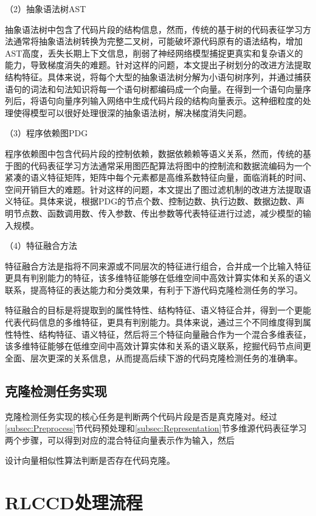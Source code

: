 （2）抽象语法树AST

抽象语法树中包含了代码片段的结构信息，然而，传统的基于树的代码表征学习方法通常将抽象语法树转换为完整二叉树，可能破坏源代码原有的语法结构，增加AST高度，丢失长期上下文信息，削弱了神经网络模型捕捉更真实和复杂语义的能力，导致梯度消失的难题。针对这样的问题，本文提出子树划分的改进方法提取结构特征。具体来说，将每个大型的抽象语法树分解为小语句树序列，并通过捕获语句的词法和句法知识将每一个语句树都编码成一个向量。在得到一个语句向量序列后，将语句向量序列输入网络中生成代码片段的结构向量表示。这种细粒度的处理使得模型可以很好处理很深的抽象语法树，解决梯度消失问题。

（3）程序依赖图PDG

程序依赖图中包含代码片段的控制依赖，数据依赖赖等语义关系，然而，传统的基于图的代码表征学习方法通常采用图匹配算法将图中的控制流和数据流编码为一个紧凑的语义特征矩阵，矩阵中每个元素都是高维系数特征向量，面临消耗的时间、空间开销巨大的难题。针对这样的问题，本文提出了图过滤机制的改进方法提取语义特征。具体来说，根据PDG的节点个数、控制边数、执行边数、数据边数、声明节点数、函数调用数、传入参数、传出参数等代表特征进行过滤，减少模型的输入规模。

（4）特征融合方法

特征融合方法是指将不同来源或不同层次的特征进行组合，合并成一个比输入特征更具有判别能力的特征，该多维特征能够在低维空间中高效计算实体和关系的语义联系，提高特征的表达能力和分类效果，有利于下游代码克隆检测任务的学习。

特征融合的目标是将提取到的属性特性、结构特征、语义特征合并，得到一个更能代表代码信息的多维特征，更具有判别能力。具体来说，通过三个不同维度得到属性特性、结构特征、语义特征，然后将三个特征向量融合作为一个混合多维表征，该多维特征能够在低维空间中高效计算实体和关系的语义联系，挖掘代码节点间更全面、层次更深的关系信息，从而提高后续下游的代码克隆检测任务的准确率。

\subsection{克隆检测任务实现}
\label{subsec:Clone detection}
克隆检测任务实现的核心任务是判断两个代码片段是否是真克隆对。经过\ref{subsec:Preprocess}节代码预处理和\ref{subsec:Representation}节多维源代码表征学习两个步骤，可以得到对应的混合特征向量表示作为输入，然后


设计向量相似性算法判断是否存在代码克隆。

\section{RLCCD处理流程}
\label{sec:RLCCD flow}

